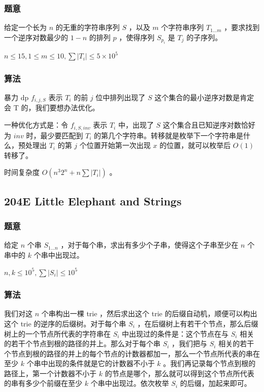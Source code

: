 \documentclass[11pt]{article}
\begin{document}
\subsubsection{题意}
\label{sec-11-7-1}

    给定一个长为 $n$ 的无重的字符串序列 $S$ ，以及 $m$ 个字符串序列 $T_{1 \dots m}$ ，要求找到一个逆序对数最少的 $1 - n$ 的排列 $p$ ，使得序列 $S_{p_i}$ 是 $T_j$ 的子序列。

    $n \leq 15, 1 \leq m \leq 10, \sum |T_i| \leq 5 \times 10^5$ 
\subsubsection{算法}
\label{sec-11-7-2}

    暴力 dp $f_{i, j, S}$ 表示 $T_i$ 的前 $j$ 位中排列出现了 $S$ 这个集合的最小逆序对数是肯定会 T 的，我们要想办法优化。

    一种优化方式是：令 $f_{i, S, inv}$ 表示 $T_i$ 中，出现了 $S$ 这个集合且已知逆序对数恰好为 $inv$ 时，最少要匹配到 $T_i$ 的第几个字符串。转移就是枚举下一个字符串是什么，预处理出 $T_i$ 的第 $j$ 个位置开始第一次出现 $x$ 的位置，就可以枚举后 $O(1)$ 转移了。

    时间复杂度 $O(n^3 2^n + n \sum |T_i|)$ 。
\subsection{204E  Little Elephant and Strings}
\label{sec-11-8}
\subsubsection{题意}
\label{sec-11-8-1}

    给定 $n$ 个串 $S_{1 \dots n}$ ，对于每个串，求出有多少个子串，使得这个子串至少在 $n$ 个串中的 $k$ 个串中出现过。

    $n, k \leq 10^5, \sum |S_i| \leq 10^5$
\subsubsection{算法}
\label{sec-11-8-2}

    我们对这 $n$ 个串构出一棵 trie ，然后求出这个 trie 的后缀自动机，顺便可以构出这个 trie 的逆序的后缀树。对于每个串 $S_i$ ，在后缀树上有若干个节点，那么后缀树上的一个节点所代表的字符串在 $S_i$ 中出现过的条件是：这个节点在与 $S_i$ 相关的若干个节点到根的路径的并上。那么对于每个串 $S_i$ ，我们把与 $S_i$ 相关的若干个节点到根的路径的并上的每个节点的计数器都加一，那么一个节点所代表的串在至少 $k$ 个串中出现的条件就是它的计数器不小于 $k$ 。我们再记录每个节点到根的路径上，第一个计数器不小于 $k$ 的节点是哪个，那么就可以得到这个节点所代表的串有多少个前缀在至少 $k$ 个串中出现过。依次枚举 $S_i$ 的后缀，加起来即可。
\end{document}
